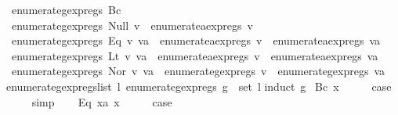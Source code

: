 \begin{isabellebody}
\ \ {\isachardoublequoteopen}enumerate{\isacharunderscore}gexp{\isacharunderscore}regs\ {\isacharparenleft}Bc\ {\isacharunderscore}{\isacharparenright}\ {\isacharequal}\ {\isacharbraceleft}{\isacharbraceright}{\isachardoublequoteclose}\ {\isacharbar}\isanewline
\ \ {\isachardoublequoteopen}enumerate{\isacharunderscore}gexp{\isacharunderscore}regs\ {\isacharparenleft}Null\ v{\isacharparenright}\ {\isacharequal}\ enumerate{\isacharunderscore}aexp{\isacharunderscore}regs\ v{\isachardoublequoteclose}\ {\isacharbar}\isanewline
\ \ {\isachardoublequoteopen}enumerate{\isacharunderscore}gexp{\isacharunderscore}regs\ {\isacharparenleft}Eq\ v\ va{\isacharparenright}\ {\isacharequal}\ enumerate{\isacharunderscore}aexp{\isacharunderscore}regs\ v\ {\isasymunion}\ enumerate{\isacharunderscore}aexp{\isacharunderscore}regs\ va{\isachardoublequoteclose}\ {\isacharbar}\isanewline
\ \ {\isachardoublequoteopen}enumerate{\isacharunderscore}gexp{\isacharunderscore}regs\ {\isacharparenleft}Lt\ v\ va{\isacharparenright}\ {\isacharequal}\ enumerate{\isacharunderscore}aexp{\isacharunderscore}regs\ v\ {\isasymunion}\ enumerate{\isacharunderscore}aexp{\isacharunderscore}regs\ va{\isachardoublequoteclose}\ {\isacharbar}\isanewline
\ \ {\isachardoublequoteopen}enumerate{\isacharunderscore}gexp{\isacharunderscore}regs\ {\isacharparenleft}Nor\ v\ va{\isacharparenright}\ {\isacharequal}\ enumerate{\isacharunderscore}gexp{\isacharunderscore}regs\ v\ {\isasymunion}\ enumerate{\isacharunderscore}gexp{\isacharunderscore}regs\ va{\isachardoublequoteclose}\isanewline
\isanewline
{}\isamarkupfalse%
\ enumerate{\isacharunderscore}gexp{\isacharunderscore}regs{\isacharunderscore}list{\isacharcolon}\ {\isachardoublequoteopen}{\isasymexists}l{\isachardot}\ enumerate{\isacharunderscore}gexp{\isacharunderscore}regs\ g\ {\isacharequal}\ set\ l{\isachardoublequoteclose}\isanewline
%
\isadelimproof
%
\endisadelimproof
%
\isatagproof
{}\isamarkupfalse%
{\isacharparenleft}induct\ g{\isacharparenright}\isanewline
{}\isamarkupfalse%
\ {\isacharparenleft}Bc\ x{\isacharparenright}\isanewline
\ \ \isamarkupfalse%
\ \isamarkupfalse%
\ {\isacharquery}case\isanewline
\ \ \ \ \isamarkupfalse%
\ simp\isanewline
{}\isamarkupfalse%
\isanewline
\ \ \isamarkupfalse%
\ {\isacharparenleft}Eq\ x{}a\ x{}{\isacharparenright}\isanewline
\ \ \isamarkupfalse%
\ \isamarkupfalse%
\ {\isacharquery}case\isanewline
\ \ \ \ \isamarkupfalse%

\end{isabellebody}
